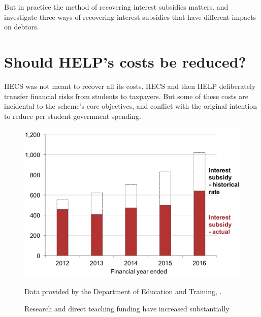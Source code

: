 \documentclass{grattan}
\begin{document}
But in practice the method of recovering interest subsidies matters.
 and  investigate three ways of recovering interest subsidies that have different impacts on debtors.

\section[Should {HELP}'s costs be reduced?]{Should \gls{HELP}'s costs be reduced?}\label{should-helps-costs-be-reduced}

\gls{HECS} was not meant to recover all its costs.
\gls{HECS} and then \gls{HELP} deliberately transfer financial risks from students to taxpayers.
But some of these costs are incidental to the scheme's core objectives, and conflict with the original intention to reduce per student government spending.

\begin{figure}
\caption{Research and direct teaching funding have increased substantially\label{fig:fig12-research-direct-teaching-funding-have-increased-substantially}}


\includegraphics[page=12]{atlas/Chartpack.pdf}

{Data provided by the Department of Education and Training,  \textcites{Australia2014HigherEducationResearcha}{ABS2015ConsumerPriceIndex}.}
\end{figure}
\end{document}
